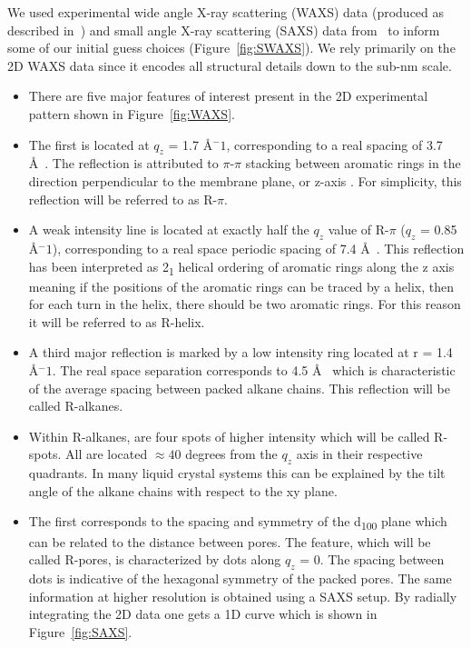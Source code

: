 \documentclass{article}
\newcommand{\angstrom}{\textup{\AA}}
\begin{document}
  We used experimental wide angle X-ray scattering (WAXS) data (produced as described 
  in~\cite{feng_scalable_2014}) and small angle X-ray scattering (SAXS) data from~\cite{feng_thin_2016}
  to inform some of our initial guess choices (Figure~\ref{fig:SWAXS}). We rely primarily
  on the 2D WAXS data since it encodes all structural details down to the sub-nm scale.
  \begin{itemize}
        \item There are five major features of interest present in the 2D experimental
        pattern shown in Figure~\ref{fig:WAXS}.
        \item The first is located at $q_z$ = 1.7 \angstrom$^-1$,
        corresponding to a real spacing of 3.7 \angstrom~. The reflection is
        attributed to $\pi$-$\pi$ stacking between aromatic rings in the direction
        perpendicular to the membrane plane, or z-axis \cite{feng_scalable_2014}. For simplicity, this
        reflection will be referred to as R-$\pi$.
        \item A weak intensity line is located at exactly half the $q_z$ value of
        R-$\pi$ ($q_z$ = 0.85 \angstrom$^-1$), corresponding to a
        real space periodic spacing of 7.4 \angstrom~. This reflection has been
        interpreted  as 2\textsubscript{1} helical ordering of aromatic rings
        along the z axis meaning if the positions of the aromatic rings can
        be traced by a helix, then for each turn in the helix, there should be
        two aromatic rings. For this reason it will be referred to as R-helix.
        \item A third major reflection is marked by a low intensity ring located
        at r = 1.4 \angstrom$^-1$. The real space separation
        corresponds to 4.5 \angstrom~ which is characteristic of the average
        spacing between packed alkane chains. This reflection will be called R-alkanes.
        \item Within R-alkanes, are four spots of higher intensity which
        will be called R-spots. All are located $\approx 40$ degrees from the $q_z$ axis
        in their respective quadrants. In many liquid crystal systems this can be
        explained by the tilt angle of the alkane chains with respect to the xy plane. %
        \item The first corresponds to the spacing and symmetry of
        the d\textsubscript{100} plane which can be related to the distance between
        pores. The feature, which will be called R-pores, is characterized by dots
        along $q_z$ = 0. The spacing between dots is indicative of the hexagonal
        symmetry of the packed pores. The same information at higher resolution is obtained using a SAXS
        setup. By radially integrating the 2D data one gets a 1D curve which is 
        shown in Figure~\ref{fig:SAXS}.  %
  \end{itemize}
\end{document}
